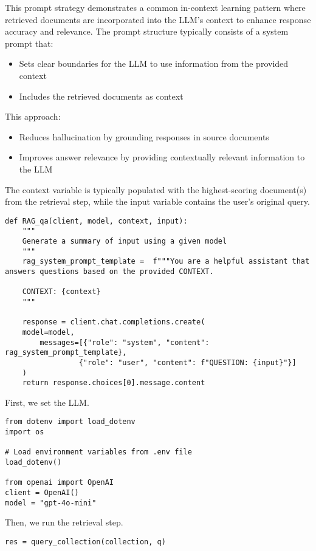 This prompt strategy demonstrates a common in-context learning pattern where retrieved documents are incorporated into the LLM's context to enhance response accuracy and relevance. The prompt structure typically consists of a system prompt that:

\begin{itemize}
    \item Sets clear boundaries for the LLM to use information from the provided context
    \item Includes the retrieved documents as context
\end{itemize}

This approach:
\begin{itemize}
    \item Reduces hallucination by grounding responses in source documents
    \item Improves answer relevance by providing contextually relevant information to the LLM
\end{itemize}
The context variable is typically populated with the highest-scoring document(s) from the retrieval step, while the input variable contains the user's original query.

\begin{verbatim}
def RAG_qa(client, model, context, input):
    """
    Generate a summary of input using a given model
    """
    rag_system_prompt_template =  f"""You are a helpful assistant that answers questions based on the provided CONTEXT.

    CONTEXT: {context}
    """
    
    response = client.chat.completions.create(
    model=model,
        messages=[{"role": "system", "content": rag_system_prompt_template},
                 {"role": "user", "content": f"QUESTION: {input}"}]
    )
    return response.choices[0].message.content
\end{verbatim}

First, we set the LLM.

\begin{verbatim}
from dotenv import load_dotenv
import os

# Load environment variables from .env file
load_dotenv()

from openai import OpenAI
client = OpenAI()
model = "gpt-4o-mini"
\end{verbatim}

Then, we run the retrieval step.

\begin{verbatim}
res = query_collection(collection, q)
\end{verbatim}

